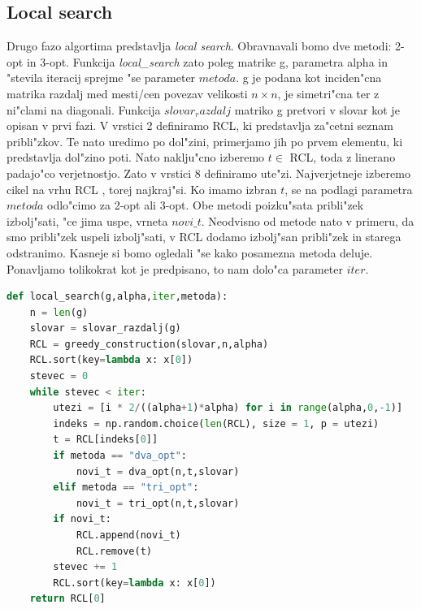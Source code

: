 \documentclass[12pt,a4paper]{amsart}
\theoremstyle{definition} %
\theoremstyle{plain} %
\begin{document}
\subsection{Local search} 

Drugo fazo algortima predstavlja \textit{local search}. Obravnavali bomo dve metodi: 2-opt in 3-opt. Funkcija \textit{local\_search} zato poleg matrike g, parametra alpha in "stevila iteracij sprejme "se parameter $metoda$. g je podana kot inciden"cna matrika razdalj med mesti/cen povezav velikosti $n \times n$, je simetri"cna ter z ni"clami na diagonali. Funkcija $slovar_razdalj$ matriko g pretvori v slovar kot je opisan v prvi fazi. 
V vrstici 2 definiramo RCL, ki predstavlja za"cetni seznam pribli"zkov. Te nato uredimo po dol"zini, primerjamo jih po prvem elementu, ki predstavlja dol"zino poti. Nato naklju"cno izberemo $t \in$ RCL, toda z linerano padajo"co verjetnostjo. Zato v vrstici 8 definiramo ute"zi. Najverjetneje izberemo cikel na vrhu RCL , torej najkraj"si. Ko imamo izbran $t$, se na podlagi parametra $metoda$ odlo"cimo za 2-opt ali 3-opt. Obe metodi poizku"sata pribli"zek izbolj"sati, "ce jima uspe, vrneta $novi\_t$. Neodvisno od metode nato v primeru, da smo pribli"zek uspeli izbolj"sati, v RCL dodamo izbolj"san pribli"zek in starega odstranimo. Kasneje si bomo ogledali "se kako posamezna metoda deluje. Ponavljamo tolikokrat kot je predpisano, to nam dolo"ca parameter $iter$. 

\begin{lstlisting}[language=Python]
def local_search(g,alpha,iter,metoda):
    n = len(g)
    slovar = slovar_razdalj(g) 
    RCL = greedy_construction(slovar,n,alpha)
    RCL.sort(key=lambda x: x[0]) 
    stevec = 0
    while stevec < iter: 
        utezi = [i * 2/((alpha+1)*alpha) for i in range(alpha,0,-1)]
        indeks = np.random.choice(len(RCL), size = 1, p = utezi) 
        t = RCL[indeks[0]]
        if metoda == "dva_opt":
            novi_t = dva_opt(n,t,slovar)
        elif metoda == "tri_opt":
            novi_t = tri_opt(n,t,slovar)
        if novi_t:
            RCL.append(novi_t) 
            RCL.remove(t) 
        stevec += 1
        RCL.sort(key=lambda x: x[0]) 
    return RCL[0] 
\end{lstlisting}
\end{document}
